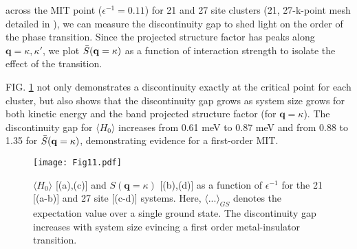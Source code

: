 \documentclass[
 reprint,
 amsmath,amssymb,
 aps, prx,
floatfix,longbibliography,
]{revtex4-2}
\begin{document}
\begin{appendix}
across the MIT point ($\epsilon^{-1}=0.11$) for 21 and 27 site clusters (21, 27-k-point mesh detailed in \cite{wilhelm2021interplay}), we can measure the discontinuity gap to shed light on the order of the phase transition. Since the projected structure factor has peaks along $\mathbf{q}=\kappa,\kappa'$, we plot $\Bar{S}(\mathbf{q}=\kappa)$ as a function of interaction strength to isolate the effect of the transition. 

FIG. \ref{fig:11} not only demonstrates a discontinuity exactly at the critical point for each cluster, but also shows that the discontinuity gap grows as system size grows for both kinetic energy and the band projected structure factor (for $\mathbf{q}=\kappa$). The discontinuity gap for $\langle H_0 \rangle$ increases from 0.61 meV to 0.87 meV and from 0.88 to 1.35 for $\Bar{S}(\mathbf{q}=\kappa)$, demonstrating evidence for a first-order MIT. 

\begin{figure}[b!]
    \centering
    \texttt{[image: Fig11.pdf]}
    \caption{$\langle H_0 \rangle$ [(a),(c)] and $S(\mathbf{q}=\kappa)$ [(b),(d)] as a function of $\epsilon^{-1}$ for the 21 [(a-b)] and 27 site [(c-d)] systems. Here, $\langle ... \rangle_{GS}$ denotes the expectation value over a single ground state. The discontinuity gap increases with system size evincing a first order metal-insulator transition.
    }
    \label{fig:11}
\end{figure}


\end{appendix}




\end{document}
